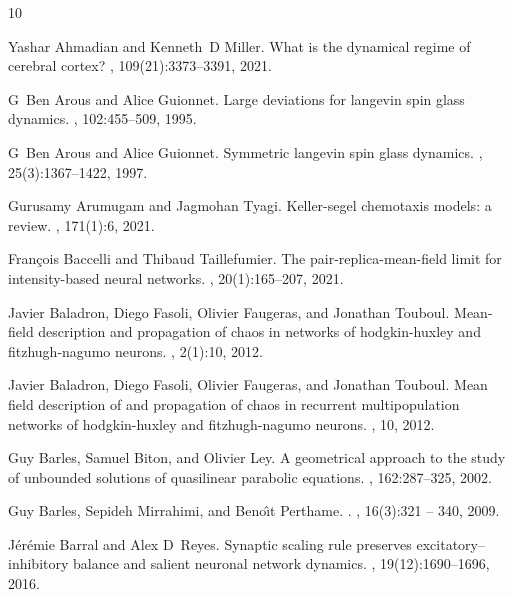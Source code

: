 \documentclass[onefignum,onetabnum]{siamart190516}
\newcommand{\1}{\mathbbm{1}}
\begin{document}
\begin{thebibliography}{10}

Yashar Ahmadian and Kenneth~D Miller.
\newblock What is the dynamical regime of cerebral cortex?
, 109(21):3373--3391, 2021.

G~Ben Arous and Alice Guionnet.
\newblock Large deviations for langevin spin glass dynamics.
, 102:455--509, 1995.

G~Ben Arous and Alice Guionnet.
\newblock Symmetric langevin spin glass dynamics.
, 25(3):1367--1422, 1997.

Gurusamy Arumugam and Jagmohan Tyagi.
\newblock Keller-segel chemotaxis models: a review.
, 171(1):6, 2021.

Fran{\c{c}}ois Baccelli and Thibaud Taillefumier.
\newblock The pair-replica-mean-field limit for intensity-based neural
  networks.
, 20(1):165--207,
  2021.

Javier Baladron, Diego Fasoli, Olivier Faugeras, and Jonathan Touboul.
\newblock Mean-field description and propagation of chaos in networks of
  hodgkin-huxley and fitzhugh-nagumo neurons.
, 2(1):10, 2012.

Javier Baladron, Diego Fasoli, Olivier Faugeras, and Jonathan Touboul.
\newblock Mean field description of and propagation of chaos in recurrent
  multipopulation networks of hodgkin-huxley and fitzhugh-nagumo neurons.
, 10, 2012.

Guy Barles, Samuel Biton, and Olivier Ley.
\newblock A geometrical approach to the study of unbounded solutions of
  quasilinear parabolic equations.
, 162:287--325,
  2002.

Guy Barles, Sepideh Mirrahimi, and Beno{\^\i}t Perthame.
.
, 16(3):321 -- 340, 2009.

J{\'e}r{\'e}mie Barral and Alex D~Reyes.
\newblock Synaptic scaling rule preserves excitatory--inhibitory balance and
  salient neuronal network dynamics.
, 19(12):1690--1696, 2016.


\end{thebibliography}
\end{document}
